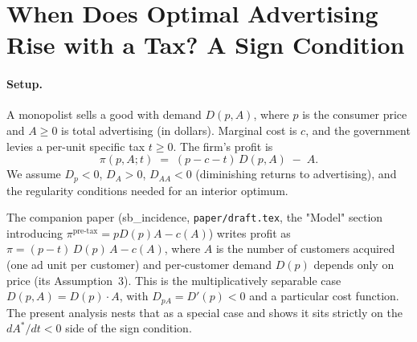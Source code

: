 
\section*{When Does Optimal Advertising Rise with a Tax?
A Sign Condition}

%
%

\paragraph{Setup.} A monopolist sells a good with
demand $D(p, A)$, where $p$ is the consumer price and
$A \geq 0$ is total advertising (in dollars). Marginal
cost is $c$, and the government levies a per-unit
specific tax $t \geq 0$. The firm's profit is
\begin{equation}\label{eq:profit}
    \pi(p, A; t)
    \;=\; (p - c - t)\, D(p, A) \;-\; A.
\end{equation}
We assume $D_p < 0$, $D_A > 0$, $D_{AA} < 0$ (diminishing
returns to advertising), and the regularity conditions
needed for an interior optimum.

\begin{remark}
The companion paper (sb\_incidence,
\texttt{paper/draft.tex}, the "Model" section
introducing $\pi^{\text{pre-tax}} = p D(p) A - c(A)$)
writes profit as
$\pi = (p-t) \, D(p) \, A - c(A)$,
where $A$ is the number of customers acquired (one ad
unit per customer) and per-customer demand $D(p)$
depends only on price (its Assumption~3). This is the
multiplicatively separable case $D(p, A) = D(p) \cdot A$,
with $D_{pA} = D'(p) < 0$ and a particular cost function.
The present analysis nests that as a special case and
shows it sits strictly on the $dA^*/dt < 0$ side of the
sign condition.
\end{remark}

